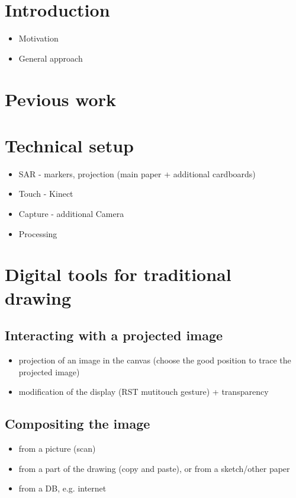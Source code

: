 \documentclass{sigchi}
\begin{document}
\section{Introduction}
\begin{itemize}
	\item Motivation
	\item General approach 
\end{itemize}


\section{Pevious work}


\section{Technical setup}
\begin{itemize}
	\item SAR - markers, projection  (main paper + additional cardboards)
	\item Touch - Kinect
	\item Capture - additional Camera	 
	\item Processing
\end{itemize}


\section{Digital tools for traditional drawing}

\subsection{Interacting with a projected image}
\begin{itemize}
  \item projection of an image in the canvas (choose the good position to trace the projected image)
	\item modification of the display (RST mutitouch gesture) + transparency		 
\end{itemize}

\subsection{Compositing the image}
\begin{itemize}
  \item from a picture (scan)
  \item from a part of the drawing (copy and paste), or from a sketch/other paper
  \item from a DB, e.g. internet
\end{itemize}
\end{document}
